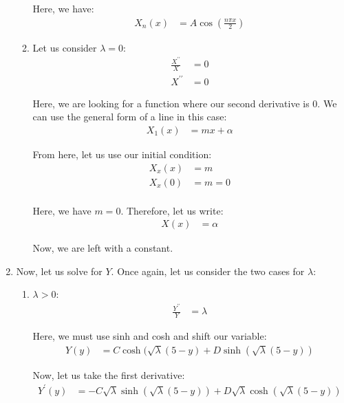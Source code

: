 \begin{enumerate}
\begin{enumerate}
  Here, we have:
  \begin{align}
    X_{n}(x) & = A \cos\left(\frac{n \pi x}{2}\right)
  \end{align}
  \item Let us consider $\lambda = 0$:
  \begin{align}
    \frac{X^{\prime\prime}}{X} & = 0\\
    X^{\prime\prime} & = 0
  \end{align}

  Here, we are looking for a function where our second derivative is $0$. We can use the general form of a line in this case:
  \begin{align}
    X_1(x) & = m x + \alpha
  \end{align}

  From here, let us use our initial condition:
  \begin{align}
    X_{x}(x) & = m\\
    X_{x}(0) & = m = 0\\
  \end{align}

  Here, we have $m = 0$. Therefore, let us write:
  \begin{align}
    X(x) & = \alpha
  \end{align}

  Now, we are left with a constant.
\end{enumerate}

\item Now, let us solve for $Y$. Once again, let us consider the two cases for $\lambda$:
%
\begin{enumerate}
  \item $\lambda > 0$:
  \begin{align}
    \frac{Y^{\prime\prime}}{Y} & = \lambda
  \end{align}

  Here, we must use sinh and cosh and shift our variable:
  \begin{align}
    Y(y) & = C \cosh(\sqrt \lambda (5 - y) + D \sinh(\sqrt \lambda (5 - y))
  \end{align}

  Now, let us take the first derivative:
  \begin{align}
    Y^\prime(y) & = -C \sqrt \lambda \sinh (\sqrt \lambda (5 - y)) + D \sqrt \lambda \cosh(\sqrt \lambda (5 - y))
  \end{align}


\end{enumerate}
\end{enumerate}
